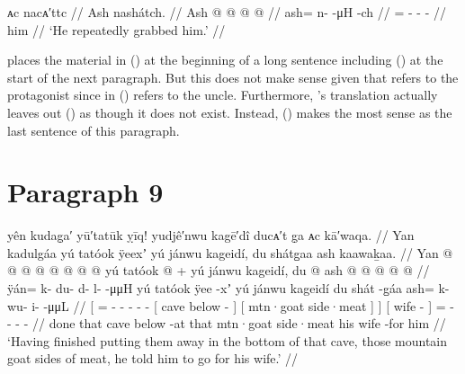 \ex\label{ex:91-88-he grabbed-him}%
%
\begingl
	\glpreamble	ᴀc nacᴀ′ttc //
	\glpreamble	Ash nashátch. //
	\gla	Ash @  @ {} @ {} @ {} //
	\glb	ash= n-  -μH -ch //
	\glc	{}= -  - - //
	\gld	him  {} {} {}  //
	\glft	‘He repeatedly grabbed him.’
		//
\endgl
\xe

\citeauthor{swanton:1909} places the material in (\lastx) at the beginning of a long sentence including (\nextx) at the start of the next paragraph.
But this does not make sense given that  refers to the protagonist since in (\nextx)  refers to the uncle.
Furthermore, \citeauthor{swanton:1909}’s translation actually leaves out (\lastx) as though it does not exist.
Instead, (\lastx) makes the most sense as the last sentence of this paragraph.

\section{Paragraph 9}\label{sec:91-para-9}

\ex\label{ex:91-89-done-put-up-meat-sent-for-wife}%
%
\begingl
	\glpreamble	yên kudag̣a′ yū′tatūk ỵīq! yudjê′nwu kagē′dî ducᴀ′t g̣a ᴀc kā′waqa. //
	\glpreamble	Yan kadulgáa yú tatóok ÿeexʼ yú jánwu kageidí, du shátg̱aa ash kaawaḵaa. //
	\gla	{} Yan @  @ {} @ {} @ {} @ {} @ {} @ {} @ {}
			{} yú tatóok  @ {} {} +
			{} yú jánwu kageidí, {} {}
		{} du  @ {} {}
		ash @  @ {} @ {} @ {} @ {} //
	\glb	{} ÿán= k- {} du- d- l-  -μμH {} 
			{} yú tatóok ÿee -xʼ {}
			{} yú jánwu kageidí {} {}
		{} du shát -g̱áa {}
		ash= k- wu- i-  -μμL //
	\glc	{}[ = - \· - - -
			 - \·
			{}[  cave below - {}]
			{}[  mtn·goat side·meat {}] {}]
		{}[  wife - {}]
		= - - -  - //
	\gld	{} done  {} {} {} {} {} {} {}
			{} that cave below -at {}
			{} that mtn·goat side·meat {} {}
		{} his wife -for {}
		him  {} {} {} {} //
	\glft	‘Having finished putting them away in the bottom of that cave, those mountain goat sides of meat, he told him to go for his wife.’
		//
\endgl
\xe

